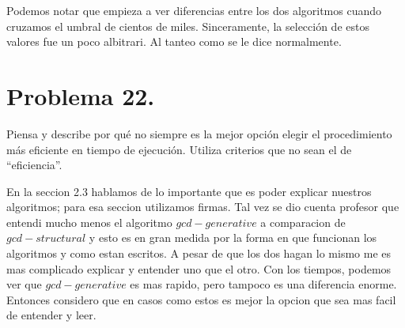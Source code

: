 \documentclass{article}
\begin{document}
Podemos notar que empieza a ver diferencias entre los dos algoritmos cuando cruzamos el umbral de cientos de miles. Sinceramente, la selección de estos valores fue un poco albitrari. Al tanteo como se le dice normalmente.

\section*{Problema 22.}
Piensa y describe por qué no siempre es la mejor opción elegir el procedimiento más
eficiente en tiempo de ejecución. Utiliza criterios que no sean el de “eficiencia”.

En la seccion 2.3 hablamos de lo importante que es poder explicar nuestros algoritmos; para esa seccion utilizamos firmas.
Tal vez se dio cuenta profesor que entendi mucho menos el algoritmo $ gcd-generative $ a comparacion de $gcd-structural$ y esto es en gran medida por la forma en que funcionan los algoritmos y como estan escritos. A pesar de que los dos hagan lo mismo me es mas complicado explicar y entender uno que el otro.
Con los tiempos, podemos ver que $gcd-generative$ es mas rapido, pero tampoco es una diferencia enorme. Entonces considero que en casos como estos es mejor la opcion que sea mas facil de entender y leer.
\end{document}

